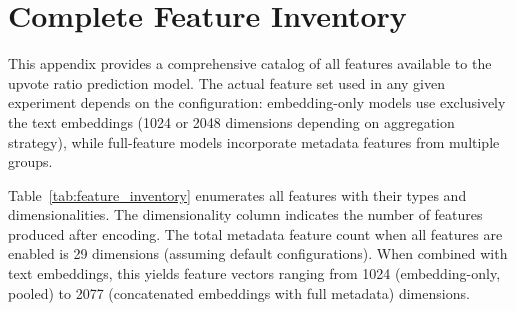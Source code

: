 \chapter{Complete Feature Inventory}
\label{app:feature_inventory}

This appendix provides a comprehensive catalog of all features available to the upvote ratio prediction model. The actual feature set used in any given experiment depends on the configuration: embedding-only models use exclusively the text embeddings (1024 or 2048 dimensions depending on aggregation strategy), while full-feature models incorporate metadata features from multiple groups.

Table~\ref{tab:feature_inventory} enumerates all features with their types and dimensionalities. The dimensionality column indicates the number of features produced after encoding. The total metadata feature count when all features are enabled is 29 dimensions (assuming default configurations). When combined with text embeddings, this yields feature vectors ranging from 1024 (embedding-only, pooled) to 2077 (concatenated embeddings with full metadata) dimensions.

